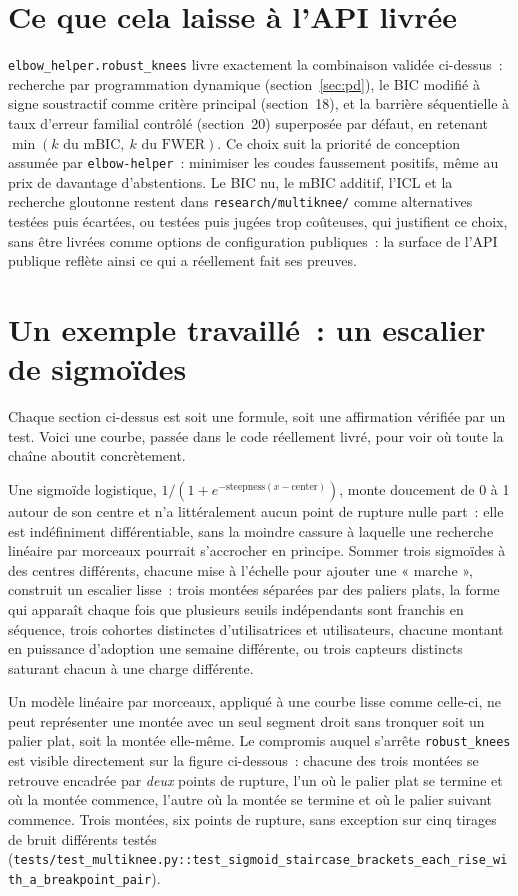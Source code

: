 \documentclass[11pt]{article}
\newcommand{\code}[1]{\texttt{#1}}
\begin{document}
\section{Ce que cela laisse à l'API livrée}

\code{elbow\_helper.robust\_knees} livre exactement la combinaison validée
ci-dessus~: recherche par programmation dynamique (section~\ref{sec:pd}),
le BIC modifié à signe soustractif comme critère principal (section~18), et
la barrière séquentielle à taux d'erreur familial contrôlé (section~20)
superposée par défaut, en retenant $\min(k \text{ du mBIC},\ k \text{ du
FWER})$. Ce choix suit la priorité de conception assumée par
\code{elbow-helper}~: minimiser les coudes faussement positifs, même au
prix de davantage d'abstentions. Le BIC nu, le mBIC additif, l'ICL et la
recherche gloutonne restent dans \code{research/multiknee/} comme
alternatives testées puis écartées, ou testées puis jugées trop coûteuses,
qui justifient ce choix, sans être livrées comme options de configuration
publiques~: la surface de l'API publique reflète ainsi ce qui a réellement
fait ses preuves.

\section{Un exemple travaillé~: un escalier de sigmoïdes}

Chaque section ci-dessus est soit une formule, soit une affirmation
vérifiée par un test. Voici une courbe, passée dans le code réellement
livré, pour voir où toute la chaîne aboutit concrètement.

Une sigmoïde logistique, $1/(1+e^{-\text{steepness}(x-\text{center})})$,
monte doucement de 0 à 1 autour de son centre et n'a littéralement aucun
point de rupture nulle part~: elle est indéfiniment différentiable, sans la
moindre cassure à laquelle une recherche linéaire par morceaux pourrait
s'accrocher en principe. Sommer trois sigmoïdes à des centres différents,
chacune mise à l'échelle pour ajouter une « marche », construit un
escalier lisse~: trois montées séparées par des paliers plats, la forme qui
apparaît chaque fois que plusieurs seuils indépendants sont franchis en
séquence, trois cohortes distinctes d'utilisatrices et utilisateurs,
chacune montant en puissance d'adoption une semaine différente, ou trois
capteurs distincts saturant chacun à une charge différente.

Un modèle linéaire par morceaux, appliqué à une courbe lisse comme
celle-ci, ne peut représenter une montée avec un seul segment droit sans
tronquer soit un palier plat, soit la montée elle-même. Le compromis auquel
s'arrête \code{robust\_knees} est visible directement sur la figure
ci-dessous~: chacune des trois montées se retrouve encadrée par \emph{deux}
points de rupture, l'un où le palier plat se termine et où la montée
commence, l'autre où la montée se termine et où le palier suivant commence.
Trois montées, six points de rupture, sans exception sur cinq tirages de
bruit différents testés
(\code{tests/test\_multiknee.py::test\_sigmoid\_staircase\_brackets\_each\_rise\_with\_a\_breakpoint\_pair}).
\end{document}

